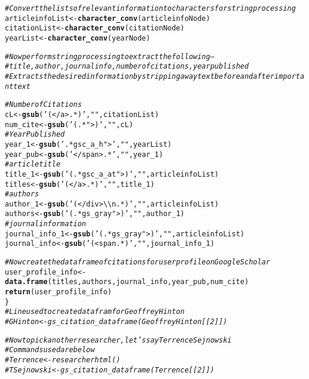 \documentclass{article}\usepackage[]{graphicx}\usepackage[]{color}
\makeatletter
\newcommand{\hlstr}[1]{\textcolor[rgb]{0.192,0.494,0.8}{#1}}%
\newcommand{\hlcom}[1]{\textcolor[rgb]{0.678,0.584,0.686}{\textit{#1}}}%
\newcommand{\hlstd}[1]{\textcolor[rgb]{0.345,0.345,0.345}{#1}}%
\newcommand{\hlkwb}[1]{\textcolor[rgb]{0.69,0.353,0.396}{#1}}%
\newcommand{\hlkwd}[1]{\textcolor[rgb]{0.737,0.353,0.396}{\textbf{#1}}}%
\newenvironment{kframe}{%
 \def\at@end@of@kframe{}%
 \ifinner\ifhmode%
  \def\at@end@of@kframe{\end{minipage}}%
  \begin{minipage}{\columnwidth}%
 \fi\fi%
 \def\FrameCommand##1{\hskip\@totalleftmargin \hskip-\fboxsep
 \colorbox{shadecolor}{##1}\hskip-\fboxsep
     \hskip-\linewidth \hskip-\@totalleftmargin \hskip\columnwidth}%
 \MakeFramed {\advance\hsize-\width
   \@totalleftmargin\z@ \linewidth\hsize
   \@setminipage}}%
 {\par\unskip\endMakeFramed%
 \at@end@of@kframe}
\newenvironment{knitrout}{}{} %
\makeatother
\begin{document}
\begin{knitrout}
\begin{kframe}
\begin{alltt}
  \hlcom{#Convert the lists of relevant information to characters for string processing}
  \hlstd{articleinfoList}\hlkwb{<-}\hlkwd{character_conv}\hlstd{(articleinfoNode)}
  \hlstd{citationList}\hlkwb{<-}\hlkwd{character_conv}\hlstd{(citationNode)}
  \hlstd{yearList}\hlkwb{<-}\hlkwd{character_conv}\hlstd{(yearNode)}

  \hlcom{#Now perform string processing to extract the following--}
  \hlcom{#title, author, journal info, number of citations, year published}
  \hlcom{#Extracts the desired information by stripping away text before and after important text}

  \hlcom{#Number of Citations}
  \hlstd{cL}\hlkwb{<-}\hlkwd{gsub}\hlstd{(}\hlstr{'(</a>.*)'}\hlstd{,}\hlstr{""}\hlstd{,citationList)}
  \hlstd{num_cite}\hlkwb{<-}\hlkwd{gsub}\hlstd{(}\hlstr{'(.*">)'}\hlstd{,}\hlstr{""}\hlstd{,cL)}
  \hlcom{#Year Published}
  \hlstd{year_1}\hlkwb{<-}\hlkwd{gsub}\hlstd{(}\hlstr{'.*gsc_a_h">'}\hlstd{,}\hlstr{""}\hlstd{,yearList)}
  \hlstd{year_pub}\hlkwb{<-}\hlkwd{gsub}\hlstd{(}\hlstr{'</span>.*'}\hlstd{,}\hlstr{""}\hlstd{,year_1)}
  \hlcom{#article title}
  \hlstd{title_1}\hlkwb{<-}\hlkwd{gsub}\hlstd{(}\hlstr{'(.*gsc_a_at">)'}\hlstd{,}\hlstr{""}\hlstd{,articleinfoList)}
  \hlstd{titles}\hlkwb{<-}\hlkwd{gsub}\hlstd{(}\hlstr{'(</a>.*)'}\hlstd{,}\hlstr{""}\hlstd{,title_1)}
  \hlcom{#authors}
  \hlstd{author_1}\hlkwb{<-}\hlkwd{gsub}\hlstd{(}\hlstr{'(</div>\textbackslash{}\textbackslash{}n.*)'}\hlstd{,}\hlstr{""}\hlstd{,articleinfoList)}
  \hlstd{authors}\hlkwb{<-}\hlkwd{gsub}\hlstd{(}\hlstr{'(.*gs_gray">)'}\hlstd{,}\hlstr{""}\hlstd{,author_1)}
  \hlcom{#journal information}
  \hlstd{journal_info_1}\hlkwb{<-}\hlkwd{gsub}\hlstd{(}\hlstr{'(.*gs_gray">)'}\hlstd{,}\hlstr{""}\hlstd{,articleinfoList)}
  \hlstd{journal_info}\hlkwb{<-}\hlkwd{gsub}\hlstd{(}\hlstr{'(<span.*)'}\hlstd{,}\hlstr{""}\hlstd{,journal_info_1)}

  \hlcom{#Now create the dataframe of citations for user profile on Google Scholar}
  \hlstd{user_profile_info}\hlkwb{<-}\hlkwd{data.frame}\hlstd{(titles, authors, journal_info, year_pub, num_cite)}
  \hlkwd{return}\hlstd{(user_profile_info)}
\hlstd{\}}
\hlcom{#Line used to create data fram for Geoffrey Hinton}
\hlcom{#GHinton<-gs_citation_dataframe(GeoffreyHinton[[2]])}

\hlcom{#Now to pick another researcher, let's say Terrence Sejnowski}
\hlcom{#Commands used are below}
\hlcom{#Terrence<-researcherhtml()}
\hlcom{#TSejnowski<-gs_citation_dataframe(Terrence[[2]])}
\end{alltt}
\end{kframe}
\end{knitrout}
\end{document}
